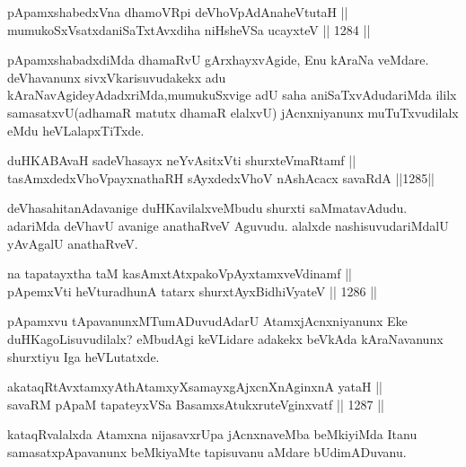 \begin{shl}
pApamxshabedxVna dhamoVR\s pi deVhoVpAdAnaheVtutaH || \\
mumukoSxVsatxdaniSaTxtAvxdiha niHsheVSa ucayxteV \hfill || 1284 ||  
\end{shl}

\begin{artha}
pApamxshabadxdiMda dhamaRvU gArxhayxvAgide, Enu kAraNa veMdare. deVhavanunx sivxVkarisuvudakekx adu kAraNavAgideyAdadxriMda,\break mumukuSxvige adU saha aniSaTxvAdudariMda ililx samasatxvU\break (adhamaR matutx dhamaR elalxvU) jAcnxniyanunx muTuTxvudilalx eMdu heVLalapxTiTxde.
\end{artha}


\begin{shl}
duHKABAvaH sadeVhasayx neYvAsitxVti shurxteVmaRtamf || \\
tasAmxdedxVhoV\s payxnathaRH sAyxdedxVhoV nAshAcacx savaRdA \hfill ||1285||  
\end{shl}

\begin{artha}
deVhasahitanAdavanige duHKavilalxveMbudu shurxti saMmata\-\break vAdudu. adariMda deVhavU avanige anathaRveV Aguvudu. alalxde nashisuvudariMdalU yAvAgalU anathaRveV.
\end{artha}


\begin{shl}
na tapatayxtha taM kasAmxtAtxpakoV\s pAyxtamxveVdinamf ||  \\
pApemxVti heVturadhunA tatarx shurxtAyx\s BidhiVyateV \hfill || 1286 ||  
\end{shl}

\begin{artha}
pApamxvu tApavanunxMTumADuvudAdarU AtamxjAcnxniyanunx Eke duHKagoLisuvudilalx? eMbudAgi keVLidare adakekx beVkAda kAraNavanunx shurxtiyu Iga heVLutatxde.
\end{artha}

\begin{shl}
akataqRtAvxtamxyAthAtamxyXsamayxgAjxcnXnAginxnA yataH || \\
savaRM pApaM tapateyxVSa BasamxsAtukxruteV\s ginxvatf \hfill || 1287 ||  
\end{shl}

\begin{artha}
kataqRvalalxda Atamxna nijasavxrUpa jAcnxnaveMba beMkiyiMda Itanu samasatxpApavanunx beMkiyaMte tapisuvanu aMdare bUdi\break mADuvanu.
\end{artha}

